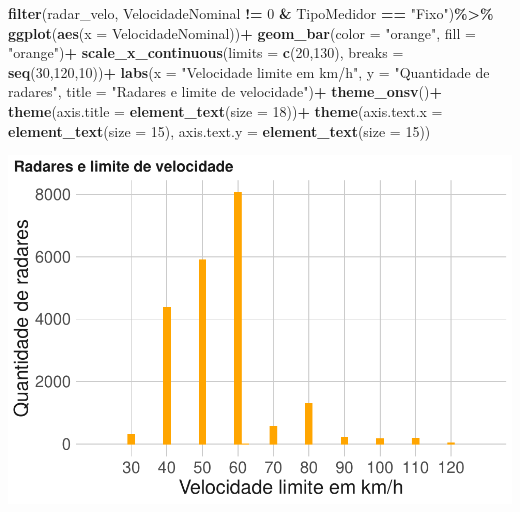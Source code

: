 \documentclass[
]{book}
\newenvironment{Shaded}{\begin{snugshade}}{\end{snugshade}}
\newcommand{\AttributeTok}[1]{\textcolor[rgb]{0.13,0.29,0.53}{#1}}
\newcommand{\DecValTok}[1]{\textcolor[rgb]{0.00,0.00,0.81}{#1}}
\newcommand{\FunctionTok}[1]{\textcolor[rgb]{0.13,0.29,0.53}{\textbf{#1}}}
\newcommand{\NormalTok}[1]{#1}
\newcommand{\SpecialCharTok}[1]{\textcolor[rgb]{0.81,0.36,0.00}{\textbf{#1}}}
\newcommand{\StringTok}[1]{\textcolor[rgb]{0.31,0.60,0.02}{#1}}
\begin{document}
\begin{Shaded}
\begin{Highlighting}[]
\FunctionTok{filter}\NormalTok{(radar\_velo, VelocidadeNominal }\SpecialCharTok{!=} \DecValTok{0} \SpecialCharTok{\&}\NormalTok{ TipoMedidor }\SpecialCharTok{==} \StringTok{"Fixo"}\NormalTok{)}\SpecialCharTok{\%\textgreater{}\%} 
  \FunctionTok{ggplot}\NormalTok{(}\FunctionTok{aes}\NormalTok{(}\AttributeTok{x =}\NormalTok{ VelocidadeNominal))}\SpecialCharTok{+}
  \FunctionTok{geom\_bar}\NormalTok{(}\AttributeTok{color =} \StringTok{"orange"}\NormalTok{, }\AttributeTok{fill =} \StringTok{"orange"}\NormalTok{)}\SpecialCharTok{+}
  \FunctionTok{scale\_x\_continuous}\NormalTok{(}\AttributeTok{limits =} \FunctionTok{c}\NormalTok{(}\DecValTok{20}\NormalTok{,}\DecValTok{130}\NormalTok{),}
                     \AttributeTok{breaks =} \FunctionTok{seq}\NormalTok{(}\DecValTok{30}\NormalTok{,}\DecValTok{120}\NormalTok{,}\DecValTok{10}\NormalTok{))}\SpecialCharTok{+}
  \FunctionTok{labs}\NormalTok{(}\AttributeTok{x =} \StringTok{"Velocidade limite em km/h"}\NormalTok{,}
       \AttributeTok{y =} \StringTok{"Quantidade de radares"}\NormalTok{,}
       \AttributeTok{title =} \StringTok{"Radares e limite de velocidade"}\NormalTok{)}\SpecialCharTok{+}
  \FunctionTok{theme\_onsv}\NormalTok{()}\SpecialCharTok{+}
  \FunctionTok{theme}\NormalTok{(}\AttributeTok{axis.title =} \FunctionTok{element\_text}\NormalTok{(}\AttributeTok{size =} \DecValTok{18}\NormalTok{))}\SpecialCharTok{+}
  \FunctionTok{theme}\NormalTok{(}\AttributeTok{axis.text.x =} \FunctionTok{element\_text}\NormalTok{(}\AttributeTok{size =} \DecValTok{15}\NormalTok{),}
        \AttributeTok{axis.text.y =} \FunctionTok{element\_text}\NormalTok{(}\AttributeTok{size =} \DecValTok{15}\NormalTok{)) }
\end{Highlighting}
\end{Shaded}

\includegraphics{_main_files/figure-latex/unnamed-chunk-20-1.pdf}
\end{document}
